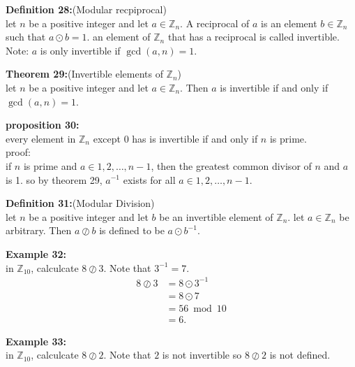 \documentclass[12pt]{article}
\begin{document}
\vspace{5mm}
\noindent\textbf{Definition 28:}(Modular recpiprocal)
\\ let $n$ be a positive integer and let $a\in \mathbb{Z}_n$. 
A reciprocal of $a$ is an element $b \in \mathbb{Z}_n$ such that $a \odot b = 1$.
an element of $\mathbb{Z}_n$ that has a reciprocal is called invertible.
\\Note: $a$ is only invertible if $\gcd(a,n) = 1$.

\vspace{5mm}
\noindent\textbf{Theorem 29:}(Invertible elements of $\mathbb{Z}_n$)
\\ let $n$ be a positive integer and let $a \in \mathbb{Z}_n$. 
Then $a$ is invertible if and only if $\gcd(a,n) = 1$.

\vspace{5mm}
\noindent\textbf{proposition 30:}
\\ every element in $\mathbb{Z}_n$ except $0$ has is invertible if and only if $n$ is prime.
\\proof:
\\if $n$ is prime and $a \in {1,2,\dots,n-1}$, then the greatest common divisor of $n$ and $a$ is 1. so by theorem 29, $a^{-1}$ exists for all $a \in {1,2,\dots,n-1}$.


\vspace{5mm}
\noindent\textbf{Definition 31:}(Modular Division)
\\ let $n$ be a positive integer and let $b$ be an invertible element of $\mathbb{Z}_n$. let $ a \in \mathbb{Z}_n$ be arbitrary. Then $ a \oslash b$ is defined to be $a \odot b^{-1}$.

\vspace{5mm}
\noindent\textbf{Example 32:}
\\ in $\mathbb{Z}_{10}$, calculcate $8 \oslash 3$. Note that $3^{-1} = 7$.
\begin{align*}
8 \oslash 3 & = 8 \odot 3^{-1} \\
& = 8 \odot 7 \\
& = 56 \bmod 10 \\
& = 6.
\end{align*}

\vspace{5mm}
\noindent\textbf{Example 33:}
\\ in $\mathbb{Z}_{10}$, calculcate $8 \oslash 2$. Note that $2$ is not invertible so $8 \oslash 2$ is not defined.
\end{document}
